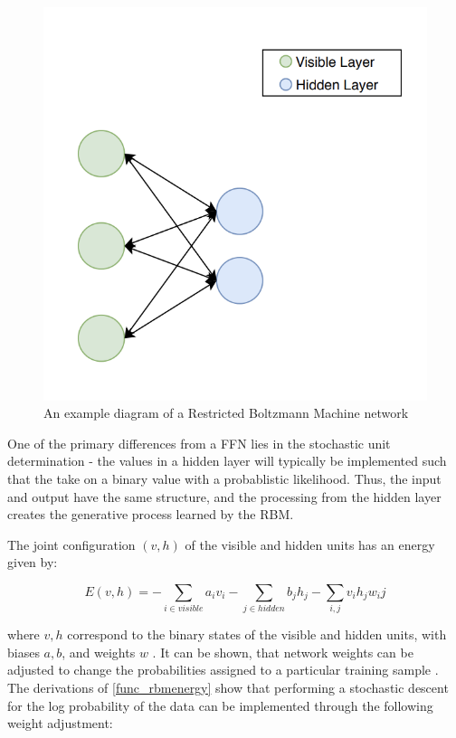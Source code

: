 \documentclass[a4paper,11pt,oneside]{article}
\theoremstyle{plain}
\theoremstyle{definition}
\begin{document}
\begin{figure}[H]
	\centering 
	\includegraphics[scale=0.5]{images/implementation/rbm_network_diagram.png}
	\caption{An example diagram of a Restricted Boltzmann Machine network}
	\label{figure-rbm_network_diagram}
\end{figure}		

One of the primary differences from a FFN lies in the stochastic unit determination - the values in a hidden layer will typically be implemented such that the take on a binary value with a probablistic likelihood. Thus, the input and output have the same structure, and the processing from the hidden layer creates the generative process learned by the RBM. \newline

The joint configuration $(v,h)$ of the visible and hidden units has an energy given by:

\begin{equation}\label{func_rbmenergy}
E(v,h) = - \sum_{i \in visible} a_iv_i - \sum_{j \in hidden} b_jh_j - \sum_{i,j}v_ih_jw_ij
\end{equation}

where $v,h$ correspond to the binary states of the visible and hidden units, with biases $a,b$, and weights $w$ \cite{Hinton5}. It can be shown, that network weights can be adjusted to change the probabilities assigned to a particular training sample \cite{Hinton5}. The derivations of \ref{func_rbmenergy} show that performing a stochastic descent for the log probability of the data can be implemented through the following weight adjustment:
\end{document}
